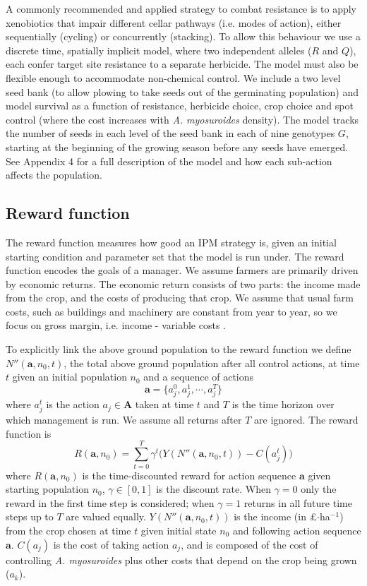 \documentclass[9pt,twocolumn,twoside,lineno]{pnas-new}
\begin{document}
{A commonly recommended \citep{REX2013} and applied \citep{Hick2018} strategy to combat resistance is to apply xenobiotics that impair different cellar pathways (i.e. modes of action), either sequentially (cycling) or concurrently (stacking). To allow this behaviour we use a discrete time, spatially implicit model, where two independent alleles ($R$ and $Q$), each confer target site resistance to a separate herbicide. The model must also be flexible enough to accommodate non-chemical control. We include a two level seed bank (to allow plowing to take seeds out of the germinating population) and model survival as a function of resistance, herbicide choice, crop choice and spot control (where the cost increases with \textit{A. myosuroides} density). The model tracks the number of seeds in each level of the seed bank in each of nine genotypes $G$, starting at the beginning of the growing season before any seeds have emerged. See Appendix 4 for a full description of the model and how each sub-action affects the population. 

\subsection*{Reward function}
The reward function measures how good an IPM strategy is, given an initial starting condition and parameter set that the model is run under. The reward function encodes the goals of a manager. We assume farmers are primarily driven by economic returns. The economic return consists of two parts: the income made from the crop, and the costs of producing that crop. We assume that usual farm costs, such as buildings and machinery are constant from year to year, so we focus on gross margin, i.e. income - variable costs \citep[pp.~3--4]{Nix2016}. 

To explicitly link the above ground population to the reward function we define $N''(\mathbf{a}, n_0, t)$, the total above ground population after all control actions, at time $t$ given an initial population $n_0$ and a sequence of actions 
\begin{equation}
	\mathbf{a} = \{a_j^0, a_j^1, \cdots, a_j^T\}
\end{equation}	  
where $a_j^t$ is the action $a_j \in \mathbf{A}$ taken at time $t$ and $T$ is the time horizon over which management is run. We assume all returns after $T$ are ignored. The reward function is  
\begin{equation}
	R(\mathbf{a}, n_0) = \sum_{t=0}^T \gamma^t \Big( Y(N''(\mathbf{a}, n_0, t)) - C(a_j^t) \Big)
\end{equation}
where $R(\mathbf{a}, n_0)$ is the time-discounted reward for action sequence $\mathbf{a}$ given starting population $n_0$, $\gamma \in [0, 1]$ is the discount rate. When $\gamma = 0$ only the reward in the first time step is considered; when $\gamma = 1$ returns in all future time steps up to $T$ are valued equally. $Y(N''(\mathbf{a}, n_0, t))$ is the income (in \pounds$\cdot$ha$^{-1}$) from the crop chosen at time $t$ given initial state $n_0$ and following action sequence $\mathbf{a}$. $C(a_j)$ is the cost of taking action $a_j$, and is composed of the cost of controlling \textit{A. myosuroides} plus other costs that depend on the crop being grown ($a_k$).   

}
\end{document}
